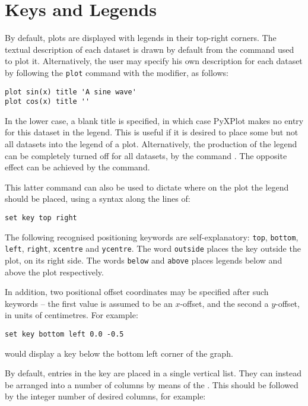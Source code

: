\section{Keys and Legends}

By default, plots are displayed with legends in their top-right corners. The
textual description of each dataset is drawn by default from the command used
to plot it. Alternatively, the user may specify his own description for each
dataset by following the {\tt plot} command with the  modifier,
as follows:

\begin{verbatim}
plot sin(x) title 'A sine wave'
plot cos(x) title ''
\end{verbatim}

In the lower case, a blank title is specified, in which case PyXPlot makes no
entry for this dataset in the legend. This is useful if it is desired to place
some but not all datasets into the legend of a plot.  Alternatively, the
production of the legend can be completely turned off for all datasets, by the
command . The opposite effect can be achieved by the
 command.

This latter command can also be used to dictate where on the plot the legend
should be placed, using a syntax along the lines of:

\begin{verbatim}
set key top right
\end{verbatim}

The following recognised positioning keywords are self-explanatory:
{\tt top}, {\tt bottom}, {\tt left}, {\tt right}, {\tt xcentre}
and {\tt ycentre}. The word {\tt outside} places the key outside the
plot, on its right side. The words {\tt below} and {\tt above} places
legends below and above the plot respectively.

In addition, two positional offset coordinates may be specified after such
keywords -- the first value is assumed to be an $x$-offset, and the second a
$y$-offset, in units of centimetres. For example:

\begin{verbatim}
set key bottom left 0.0 -0.5
\end{verbatim}

\noindent would display a key below the bottom left corner of the graph.

By default, entries in the key are placed in a single vertical list. They can
instead be arranged into a number of columns by means of the . This should be followed by the integer number of desired columns,
for example:


